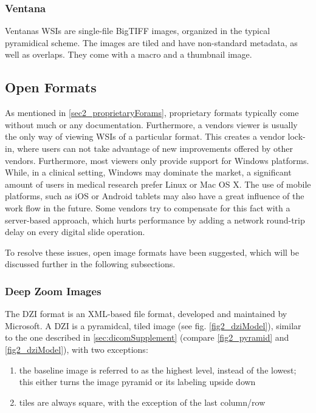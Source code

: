 \subsubsection{Ventana}
Ventanas WSIs are single-file BigTIFF images, organized in the typical pyramidical scheme. The images are tiled and have non-standard metadata, as well as overlaps. They come with a macro and a thumbnail image\cite{web:openslide}.

	
\subsection{Open Formats}
\label{sec2_openFormats}
As mentioned in \ref{sec2_proprietaryForams}, proprietary formats typically come without much or any documentation. Furthermore, a vendors viewer is usually the only way of viewing WSIs of a particular format. This creates a vendor lock-in, where users can not take advantage of new improvements offered by other vendors. Furthermore, most viewers only provide support for Windows platforms. While, in a clinical setting, Windows may dominate the market, a significant amount of users in medical research prefer Linux or Mac OS X\cite{Goode13}. The use of mobile platforms, such as iOS or Android tablets may also have a great influence of the work flow in the future. Some vendors try to compensate for this fact with a server-based approach, which hurts performance by adding a network round-trip delay on every digital slide operation\cite{Goode13}.

To resolve these issues, open image formats have been suggested, which will be discussed further in the following subsections.


\subsubsection{Deep Zoom Images}
The DZI format is an XML-based file format, developed and maintained by Microsoft\cite{web:dzi}. A DZI is a pyramidcal, tiled image (see fig. \ref{fig2_dziModel}), similar to the one described in \ref{sec:dicomSupplement} (compare \ref{fig2_pyramid} and \ref{fig2_dziModel}), with two exceptions:
\begin{enumerate}
	\item the baseline image is referred to as the highest level, instead of the lowest; this either turns the image pyramid or its labeling upside down
	\item tiles are always square, with the exception of the last column/row
\end{enumerate}

